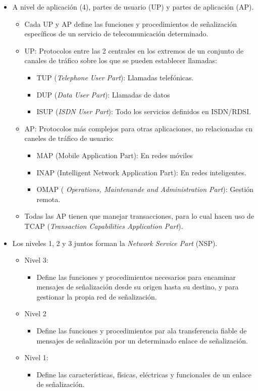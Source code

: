 \documentclass[10pt,portrait, twocolumn]{article}
\begin{document}
\begin{itemize}
\item A nivel de aplicación (4), partes de usuario (UP) y partes de aplicación (AP).
	\begin{itemize}
	\item Cada UP y AP define las funciones y procedimientos de señalización específicos de un servicio de telecomunicación determinado.
	\item UP: Protocolos entre las 2 centrales en los extremos de un conjunto de canales de tráfico sobre los que se pueden establecer llamadas:
		\begin{itemize}
		\item TUP (\textit{Telephone User Part}): Llamadas telefónicas.
		\item DUP (\textit{Data User Part}): Llamadas de datos
		\item ISUP (\textit{ISDN User Part}): Todo los servicios definidos en ISDN/RDSI.
		\end{itemize}
	\item AP: Protocolos más complejos para otras aplicaciones, no relacionadas cn caneles de tráfico de usuario:
		\begin{itemize}
		\item MAP (Mobile Application Part): En redes móviles
		\item INAP (Intelligent Network Application Part): En redes inteligentes.
		\item OMAP (\textit{ Operations, Maintenande and Administration Part}): Gestión remota.
		\end{itemize}
	\item Todas las AP tienen que manejar transacciones, para lo cual hacen uso de TCAP (\textit{Transaction Capabilities Application Part}).
	\end{itemize}
\item Los niveles 1, 2 y 3 juntos forman la \textit{Network Service Part} (NSP).
	\begin{itemize}
	\item Nivel 3:
		\begin{itemize}
		\item Define las funciones y procedimientos necesarios para encaminar mensajes de señalización desde su origen hasta su destino, y para gestionar la propia red de señalización.
		\end{itemize}
	\item Nivel 2
		\begin{itemize}
		\item Define las funciones y procedimientos par ala transferencia fiable de mensajes de señalización por un determinado enlace de señalización.
		\end{itemize}
	\item Nivel 1:
		\begin{itemize}
		\item Define las características, físicas, eléctricas y funcionales de un enlace de señalización.
		\end{itemize}
	\end{itemize}
\end{itemize}
\end{document}
